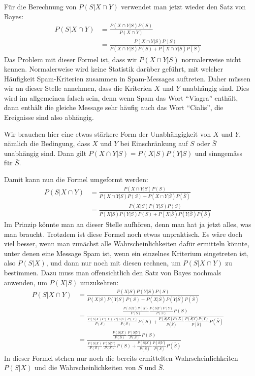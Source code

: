 Für die Berechnung von $P(S|X\cap Y)$ verwendet man jetzt wieder
den Satz von Bayes:
\begin{align}
P(S|X\cap Y)
&=
\frac{P(X\cap Y|S)P(S)}{P(X\cap Y)}\nonumber
\\
&=
\frac{P(X\cap Y|S)P(S)}{P(X\cap Y|S)P(S)+P(X\cap Y|\bar S)P(\bar S)}
\end{align}
Das Problem mit dieser Formel ist, dass wir $P(X\cap Y|S)$ normalerweise
nicht kennen.
Normalerweise wird keine Statistik darüber geführt, mit
welcher Häufigkeit Spam-Kriterien zusammen in Spam-Messages auftreten.
Daher müssen wir an dieser Stelle annehmen, dass die Kriterien $X$ und $Y$
unabhängig sind.
Dies wird im allgemeinen falsch sein, denn wenn Spam
das Wort ``Viagra'' enthält, dann enthält die gleiche Message sehr häufig
auch das Wort ``Cialis'', die Ereignisse sind also abhängig.

Wir brauchen hier eine etwas stärkere Form der Unabhängigkeit von $X$ und $Y$,
nämlich die Bedingung, dass $X$ und $Y$ bei Einschränkung auf $S$
oder $\bar S$ unabhängig sind.
Dann gilt $P(X\cap Y|S)=P(X|S)P(Y|S)$
und sinngemäss für $\bar S$.

Damit kann nun die Formel umgeformt werden:
\begin{align}
P(S|X\cap Y)
&=
\frac{P(X\cap Y|S)P(S)}{P(X\cap Y|S)P(S)+P(X\cap Y|\bar S)P(\bar S)}\nonumber
\\
&=
\frac{P(X|S)P(Y|S)P(S)}{P(X|S)P(Y|S)P(S)+P(X|\bar S)P(Y|\bar S)P(\bar S)}
\end{align}
Im Prinzip könnte man an dieser Stelle aufhören, denn man hat ja jetzt
alles, was man braucht.
Trotzdem ist diese Formel noch etwas unpraktisch.
Es wäre doch viel besser, wenn man zunächst alle Wahrscheinlichkeiten
dafür ermitteln könnte, unter denen eine Message Spam ist, wenn ein
einzelnes Kriterium eingetreten ist, also $P(S|X)$, und dann nur noch
mit diesen rechnen, um $P(S|X\cap Y)$ zu bestimmen.
Dazu muss man offensichtlich den Satz von Bayes nochmals anwenden, um
$P(X|S)$ umzukehren:
\begin{align}
P(S|X\cap Y)
&=
\frac{P(X|S)P(Y|S)P(S)}{P(X|S)P(Y|S)P(S)+P(X|\bar S)P(Y|\bar S)P(\bar S)}\nonumber
\\
&=
\frac{\displaystyle
\frac{P(S|X)P(X)}{P(S)}
\frac{P(S|Y)P(Y)}{P(S)}P(S)
}{\displaystyle
\frac{P(S|X)P(X)}{P(S)}
\frac{P(S|Y)P(Y)}{P(S)}P(S)
+
\frac{P(\bar S|X)P(X)}{P(\bar S)}
\frac{P(\bar S|Y)P(Y)}{P(\bar S)}P(\bar S)
}\nonumber
\\
&=
\frac{\displaystyle
\frac{P(S|X)}{P(S)}
\frac{P(S|Y)}{P(S)}P(S)
}{\displaystyle
\frac{P(S|X)}{P(S)}
\frac{P(S|Y)}{P(S)}P(S)
+
\frac{P(\bar S|X)}{P(\bar S)}
\frac{P(\bar S|Y)}{P(\bar S)}P(\bar S)
}
\end{align}
In dieser Formel stehen nur noch die bereits ermittelten Wahrscheinlichkeiten
$P(S|X)$ und die Wahrscheinlichkeiten von $S$ und $\bar S$.

